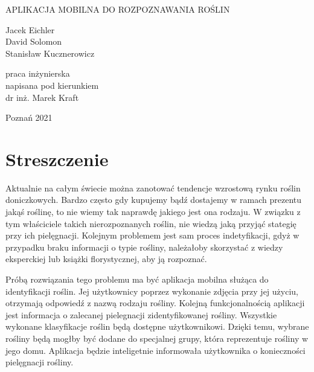 \documentclass[12pt,oneside,a4paper]{book} %
\theoremstyle{break}
\begin{document}
\thispagestyle{empty}
\begin{center}{\sc \Large
Politechnika Poznańska \\
{\large
WYDZIAŁ INFORMATYKI I TELEKOMUNIACJI \\
Instytut informatyki \\ 
Kierunek Informatyka
}
\end{center}
\vspace{5cm}
\begin{center}
{\LARGE
APLIKACJA MOBILNA DO ROZPOZNAWANIA ROŚLIN \\
}\par\vspace{1cm}\par
{\large
Jacek Eichler \\ David Solomon \\ Stanisław Kucznerowicz
}
\end{center}
\vspace{4cm}
\begin{flushright}
praca inżynierska\\
napisana pod kierunkiem\\
dr inż. Marek Kraft
\end{flushright}
\vfill
\begin{center}
Poznań 2021
\end{center}

\newpage

\chapter*{Streszczenie}

Aktualnie na całym świecie można zanotować tendencje wzrostową rynku roślin doniczkowych. Bardzo często gdy kupujemy bądź dostajemy w ramach prezentu jakąś roślinę, to nie wiemy tak naprawdę jakiego jest ona rodzaju. W związku z tym właściciele takich nierozpoznanych roślin, nie wiedzą jaką przyjąć stategię przy ich pielęgnacji. Kolejnym problemem jest sam proces indetyfikacji, gdyż w przypadku braku informacji o typie rośliny, należałoby skorzystać z wiedzy eksperckiej lub książki florystycznej, aby ją rozpoznać. \par \vspace{0.2cm}
Próbą rozwiązania tego problemu ma być aplikacja mobilna służąca do identyfikacji roślin. Jej użytkownicy poprzez wykonanie zdjęcia przy jej użyciu, otrzymają odpowiedź z nazwą rodzaju rośliny. Kolejną funkcjonalnością aplikacji jest informacja o zalecanej pielegnacji zidentyfikowanej rośliny. Wszystkie wykonane klasyfikacje roślin będą dostępne użytkownikowi. Dzięki temu, wybrane rośliny będą mogłby być dodane do specjalnej grupy, która reprezentuje rośliny w jego domu. Aplikacja będzie inteligetnie informowała  użytkownika o konieczności pielęgnacji rośliny.
\end{document}
